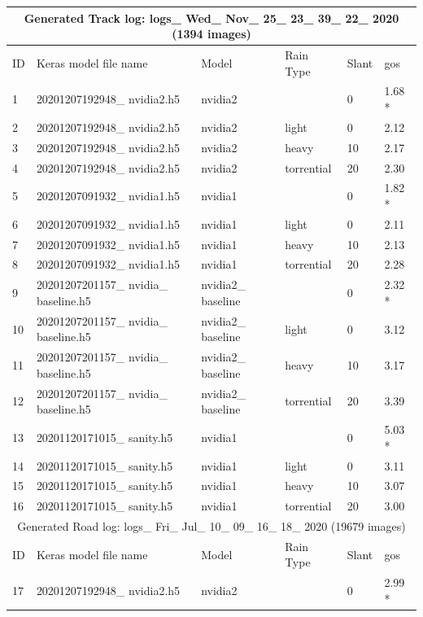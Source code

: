 \begin{table}[]
\begin{center}
\begin{tabular}{|l|l|l|l|l|l|}
\multicolumn{6}{|c|}{Generated Track log: logs\_ Wed\_ Nov\_ 25\_ 23\_ 39\_ 22\_ 2020 (1394 images)} \\ \hline
ID & Keras model file name & Model & Rain Type & Slant & gos \\ \hline
1 & 20201207192948\_ nvidia2.h5 & nvidia2 &  & 0 & 1.68 * \\ \hline
2 & 20201207192948\_ nvidia2.h5 & nvidia2 & light & 0 & 2.12 \\ \hline
3 & 20201207192948\_ nvidia2.h5 & nvidia2 & heavy & 10 & 2.17 \\ \hline
4 & 20201207192948\_ nvidia2.h5 & nvidia2 & torrential & 20 & 2.30 \\ \hline
5 & 20201207091932\_ nvidia1.h5 & nvidia1 &  & 0 & 1.82 * \\ \hline
6 & 20201207091932\_ nvidia1.h5 & nvidia1 & light & 0 & 2.11 \\ \hline
7 & 20201207091932\_ nvidia1.h5 & nvidia1 & heavy & 10 & 2.13 \\ \hline
8 & 20201207091932\_ nvidia1.h5 & nvidia1 & torrential & 20 & 2.28 \\ \hline
9 & 20201207201157\_ nvidia\_ baseline.h5 & nvidia2\_ baseline &  & 0 & 2.32 * \\ \hline
10 & 20201207201157\_ nvidia\_ baseline.h5 & nvidia2\_ baseline & light & 0 & 3.12 \\ \hline
11 & 20201207201157\_ nvidia\_ baseline.h5 & nvidia2\_ baseline & heavy & 10 & 3.17 \\ \hline
12 & 20201207201157\_ nvidia\_ baseline.h5 & nvidia2\_ baseline & torrential & 20 & 3.39 \\ \hline
13 & 20201120171015\_ sanity.h5 & nvidia1 &  & 0 & 5.03 * \\ \hline
14 & 20201120171015\_ sanity.h5 & nvidia1 & light & 0 & 3.11 \\ \hline
15 & 20201120171015\_ sanity.h5 & nvidia1 & heavy & 10 & 3.07 \\ \hline
16 & 20201120171015\_ sanity.h5 & nvidia1 & torrential & 20 & 3.00 \\ \hline
\multicolumn{6}{|c|}{Generated Road log:  logs\_ Fri\_ Jul\_ 10\_ 09\_ 16\_ 18\_ 2020 (19679 images)} \\ \hline
ID & Keras model file name & Model & Rain Type & Slant & gos \\ \hline
17 & 20201207192948\_ nvidia2.h5 & nvidia2 &  & 0 & 2.99 * \\ \hline  %

\end{tabular}
\end{center}
\end{table}
